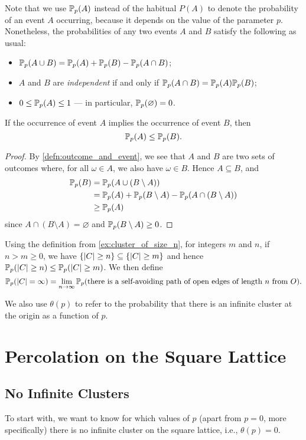 \documentclass[a4paper, 12pt]{article}
\begin{document}
Note that we use $\P(A)$ instead of the habitual $P(A)$ to denote the probability of an event $A$ occurring, because it depends on the value of the parameter $p$. Nonetheless, the probabilities of any two events $A$ and $B$ satisfy the following as usual:
\begin{itemize}
    \item $\P(A \cup B) = \P(A) + \P(B) - \P(A \cap B)$;
    \item $A$ and $B$ are \textit{independent} if and only if $\P(A \cap B) = \P(A) \P(B)$;
    \item $0 \leq \P(A) \leq 1$ --- in particular, $\P(\varnothing) = 0$.
\end{itemize}

\begin{lem}\label{lem:event_subseteq}
If the occurrence of event $A$ implies the occurrence of event $B$, then $$\P(A) \leq \P(B).$$
\end{lem}
\begin{proof}
By \cref{defn:outcome_and_event}, we see that $A$ and $B$ are two sets of outcomes where, for all $\omega \in A$, we also have $\omega \in B$. Hence $A \subseteq B$, and 
\begin{align*}
    \P(B) 
    &= \P(A \cup (B \setminus A))\\
    &= \P(A) + \P(B \setminus A) - \P(A \cap (B \setminus A))\\
    &\geq \P(A)
\end{align*}
since $A \cap (B \setminus A) = \varnothing$ and $\P(B \setminus A) \geq 0$.
\end{proof}

\begin{cor}\label{cor:inf_cluster}
Using the definition from \cref{ex:cluster_of_size_n}, for integers $m$ and $n$, if $n > m \geq 0$, we have $\{\abs{C} \geq n\} \subseteq \{\abs{C} \geq m\}$ and hence $\P(\abs{C} \geq n) \leq \P(\abs{C} \geq m)$. We then define
\[
\P(\abs{C} = \infty) 
= \lim_{n \to \infty} \P(\text{there is a self-avoiding path of open edges of length } n \text{ from } O).
\]
\end{cor}
We also use $\theta(p)$ to refer to the probability that there is an infinite cluster at the origin as a function of $p$.

\section{Percolation on the Square Lattice}
\subsection{No Infinite Clusters}
To start with, we want to know for which values of $p$ (apart from $p = 0$, more specifically) there is no infinite cluster on the square lattice, i.e., $\theta(p) = 0$.
\end{document}
